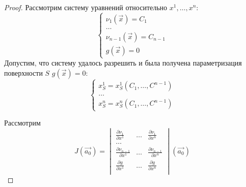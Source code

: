 \begin{proof}
    Рассмотрим систему уравнений относительно $x^1, \dots, x^n$:
    \begin{equation}
        \begin{cases}
            \nu_1 \left( \overrightarrow{x} \right) = C_1             \\
            \dots                                                     \\
            \nu_{n - 1} \left( \overrightarrow{x} \right) = C_{n - 1} \\
            g \left( \overrightarrow{x} \right) = 0
        \end{cases}
        \label{part_eq_5}
    \end{equation}
    Допустим, что систему удалось разрешить и была получена параметризация поверхности $S$ $g \left( \overrightarrow{x} \right) = 0$:
    \begin{equation*}
        \begin{cases}
            x^1_S = x^1_S \left( C_1, \dots, C^{n - 1} \right) \\
            \dots                                              \\
            x^n_S = x^n_S \left( C_1, \dots, C^{n - 1} \right)
        \end{cases}
    \end{equation*}

    Рассмотрим
    \begin{equation*}
        J \left( \overrightarrow{a_0} \right) =
        \begin{vmatrix}
            \frac{\partial \nu_1}{\partial x^1} & \dots & \frac{\partial \nu_1}{\partial x^n}             \\
            \dots                                                                                         \\
            \frac{\partial \nu_{n - 1}}{\partial x^1} & \dots & \frac{\partial \nu_{n - 1}}{\partial x^n} \\
            \frac{\partial g}{\partial x^1} & \dots & \frac{\partial g}{\partial x^n}                     \\
        \end{vmatrix}  \left( \overrightarrow{a_0} \right)
    \end{equation*}


\end{proof}
